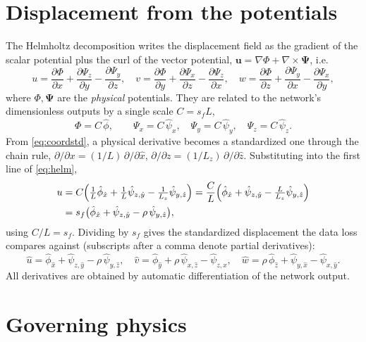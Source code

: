 \documentclass[11pt]{article}
\newcommand{\xh}{\hat{x}} \newcommand{\yh}{\hat{y}} \newcommand{\zh}{\hat{z}}
\newcommand{\uh}{\hat{u}} \newcommand{\vh}{\hat{v}} \newcommand{\wh}{\hat{w}}
\newcommand{\phih}{\hat{\phi}} \newcommand{\psih}{\hat{\psi}}
\newcommand{\dd}[2]{\frac{\partial #1}{\partial #2}}
\begin{document}
\section{Displacement from the potentials}
\label{sec:disp}
The Helmholtz decomposition writes the displacement field as the gradient of the
scalar potential plus the curl of the vector potential,
$\mathbf{u}=\nabla\Phi+\nabla\times\boldsymbol{\Psi}$, i.e.
\begin{equation}
u=\dd{\Phi}{x}+\dd{\Psi_z}{y}-\dd{\Psi_y}{z},\quad
v=\dd{\Phi}{y}+\dd{\Psi_x}{z}-\dd{\Psi_z}{x},\quad
w=\dd{\Phi}{z}+\dd{\Psi_y}{x}-\dd{\Psi_x}{y},
\label{eq:helm}
\end{equation}
where $\Phi,\boldsymbol{\Psi}$ are the \emph{physical} potentials. They are
related to the network's dimensionless outputs by a single scale $C=s_f L$,
\begin{equation}
\Phi=C\,\phih,\qquad \Psi_x=C\,\psih_x,\quad \Psi_y=C\,\psih_y,\quad \Psi_z=C\,\psih_z .
\end{equation}
From \eqref{eq:coordstd}, a physical derivative becomes a standardized one through
the chain rule, $\partial/\partial x=(1/L)\,\partial/\partial\xh$,
$\partial/\partial z=(1/L_z)\,\partial/\partial\zh$. Substituting into the first
line of \eqref{eq:helm},
\begin{align}
u &= C\Big(\tfrac{1}{L}\phih_{\xh}+\tfrac{1}{L}\psih_{z,\yh}-\tfrac{1}{L_z}\psih_{y,\zh}\Big)
= \frac{C}{L}\Big(\phih_{\xh}+\psih_{z,\yh}-\tfrac{L}{L_z}\psih_{y,\zh}\Big) \notag\\
&= s_f\big(\phih_{\xh}+\psih_{z,\yh}-\rho\,\psih_{y,\zh}\big),
\end{align}
using $C/L=s_f$. Dividing by $s_f$ gives the standardized displacement the data
loss compares against (subscripts after a comma denote partial derivatives):
\begin{equation}
\boxed{\;
\uh=\phih_{\xh}+\psih_{z,\yh}-\rho\,\psih_{y,\zh},\quad
\vh=\phih_{\yh}+\rho\,\psih_{x,\zh}-\psih_{z,\xh},\quad
\wh=\rho\,\phih_{\zh}+\psih_{y,\xh}-\psih_{x,\yh}.\;}
\label{eq:disp_std}
\end{equation}
All derivatives are obtained by automatic differentiation of the network output.

\section{Governing physics}
\label{sec:phys}
\end{document}
